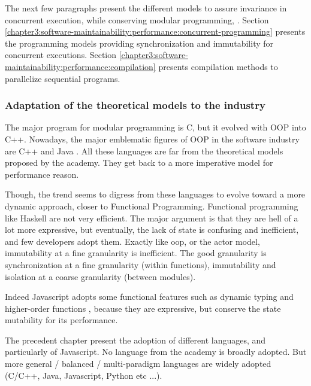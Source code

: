 The next few paragraphs present the different models to assure invariance in concurrent execution, while conserving modular programming, .
Section \ref{chapter3:software-maintainability:performance:concurrent-programming} presents the programming models providing synchronization and immutability for concurrent executions.
Section \ref{chapter3:software-maintainability:performance:compilation} presents compilation methods to parallelize sequential programs.



\subsubsection{Adaptation of the theoretical models to the industry}

The major program for modular programming is C, but it evolved with OOP into C++.
Nowadays, the major emblematic figures of OOP in the software industry are C++ and Java \cite{Gosling2000,Stroustrup1986}.
All these languages are far from the theoretical models proposed by the academy.
They get back to a more imperative model for performance reason.

Though, the trend seems to digress from these languages to evolve toward a more dynamic approach, closer to Functional Programming.
Functional programming like Haskell are not very efficient.
The major argument is that they are hell of a lot more expressive, but eventually, the lack of state is confusing and inefficient, and few developers adopt them.
Exactly like oop, or the actor model, immutability at a fine granularity is inefficient.
The good granularity is synchronization at a fine granularity (within functions), immutability and isolation at a coarse granularity (between modules).

Indeed Javascript adopts some functional features such as dynamic typing and higher-order functions \cite{Ecma1999}, because they are expressive, but conserve the state mutability for its performance.

The precedent chapter present the adoption of different languages, and particularly of Javascript.
No language from the academy is broadly adopted.
But more general / balanced / multi-paradigm languages are widely adopted (C/C++, Java, Javascript, Python etc ...).





